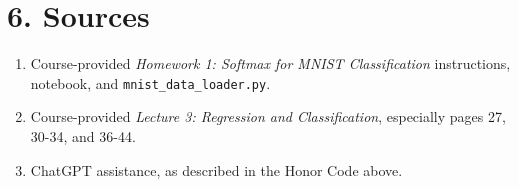 \documentclass[UTF8,a4paper,12pt,fontset=fandol]{ctexart}
\providecommand{\tightlist}{%
  \setlength{\itemsep}{0.35em}\setlength{\parskip}{0pt}}
\begin{document}
\section*{6. Sources}

\begin{enumerate}
\def\labelenumi{\arabic{enumi}.}
\tightlist
\item
  Course-provided \emph{Homework 1: Softmax for MNIST Classification} instructions, notebook, and \texttt{mnist\_data\_loader.py}.
\item
  Course-provided \emph{Lecture 3: Regression and Classification}, especially pages 27, 30-34, and 36-44.
\item
  ChatGPT assistance, as described in the Honor Code above.
\end{enumerate}
\end{document}
